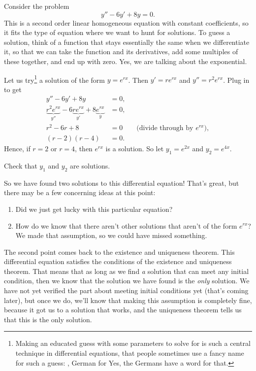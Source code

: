 Consider the problem
\begin{equation*}
y''-6y'+8y = 0.
\end{equation*}
This is a second order linear homogeneous equation with constant
coefficients, so it fits the type of equation where we want to hunt for solutions. To guess a solution, think of a function that stays essentially the
same when we differentiate it, so that we can take the function and its
derivatives, add some multiples of these together, and end up with zero.
Yes, we are talking about the exponential.

Let us try\footnote{%
Making an educated guess with some parameters to solve for 
is such a central technique in differential equations, that people sometimes use
a fancy name for such a guess: \emph{}, German for   Yes, the Germans have a word for that.}
a solution of the form $y = e^{rx}$.  Then $y' = r e^{rx}$ and
$y'' = r^2 e^{rx}$.  Plug in to get
\begin{align*}
y''-6y'+8y & = 0 , \\
\underbrace{r^2 e^{rx}}_{y''} -6 \underbrace{r e^{rx}}_{y'}+8 \underbrace{e^{rx}}_{y} & = 0 , \\
r^2 -6 r +8 & = 0 \qquad \text{(divide through by } e^{rx} \text{)},\\
(r-2)(r-4) & = 0 .
\end{align*}
Hence, if $r=2$ or $r=4$, then $e^{rx}$ is a solution.  So let $y_1 = e^{2x}$
and $y_2 = e^{4x}$.

\begin{exercise}
Check that $y_1$ and $y_2$ are solutions.
\end{exercise}

So we have found two solutions to this differential equation! That's great, but there may be a few concerning ideas at this point:
\begin{enumerate}[(1)]
\item Did we just get lucky with this particular equation?
\item How do we know that there aren't other solutions that aren't of the form $e^{rx}$? We made that assumption, so we could have missed something.
\end{enumerate}

The second point comes back to the existence and uniqueness theorem. This differential equation satisfies the conditions of the existence and uniqueness theorem. That means that as long as we find \emph{a} solution that can meet any initial condition, then we know that the solution we have found is the \emph{only} solution. We have not yet verified the part about meeting initial conditions yet (that's coming later), but once we do, we'll know that making this assumption is completely fine, because it got us to a solution that works, and the uniqueness theorem tells us that this is the only solution. 

